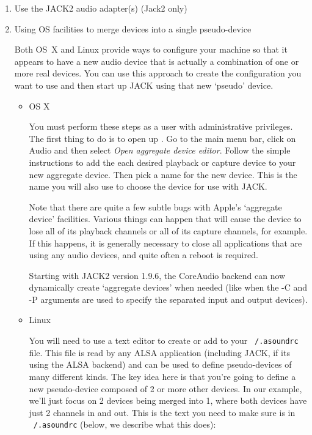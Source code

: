 \documentclass[10pt,a4paper]{book}
\newcommand{\button}[1]{#1}
\newcommand{\menu}[1]{\emph{\StrSubstitute{#1}{,}{ $\rightarrow$ }}}
\begin{document}
{\begin{enumerate}
Note that you can use these clients even if you are running JACK with
a FFADO-supported device. The requirement for ALSA support only
applies to the extra devices you want to use, not the one that JACK
itself is using.

\item Use the JACK2 audio adapter(s) (Jack2 only)


\item Using OS facilities to merge devices into a single pseudo-device

Both OS~X and Linux provide ways to configure your machine so that it
appears to have a new audio device that is actually a combination of
one or more real devices. You can use this approach to create the
configuration you want to use and then start up JACK using that new
`pseudo' device.

\begin{itemize}
\item OS X

You must perform these steps as a user with administrative
privileges. The first thing to do is to open up
\menu{Applications,Utilities,Audio/MIDI Setup}. Go to the main menu
bar, click on \button{Audio} and then select \emph{Open aggregate device
editor}. Follow the simple instructions to add the each desired
playback or capture device to your new aggregate device. Then pick a
name for the new device. This is the name you will also use to choose
the device for use with JACK\@.

Note that there are quite a few subtle bugs with Apple's `aggregate
device' facilities. Various things can happen that will cause the
device to lose all of its playback channels or all of its capture
channels, for example. If this happens, it is generally necessary to
close all applications that are using any audio devices, and quite
often a reboot is required.

Starting with JACK2 version 1.9.6, the CoreAudio backend can now
dynamically create `aggregate devices' when needed (like when the -C
and -P arguments are used to specify the separated input and output
devices).

\item Linux

You will need to use a text editor to create or add to your
\texttt{~/.asoundrc} file. This file is read by any ALSA application
(including JACK, if its using the ALSA backend) and can be used to
define pseudo-devices of many different kinds. The key idea here is
that you're going to define a new pseudo-device composed of 2 or more
other devices. In our example, we'll just focus on 2 devices being
merged into 1, where both devices have just 2 channels in and
out. This is the text you need to make sure is in \texttt{~/.asoundrc} (below,
we describe what this does):


\end{itemize}
\end{enumerate}}
\end{document}
